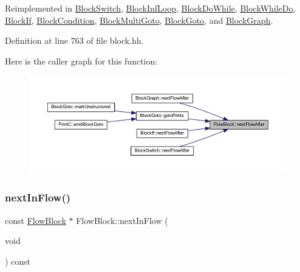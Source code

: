 Reimplemented in \mbox{\hyperlink{class_block_switch_ae13e717fc62265c1f9b5024cb0e9cd1a}{Block\+Switch}}, \mbox{\hyperlink{class_block_inf_loop_a10ef0de99961f931b7432b2662ac2677}{Block\+Inf\+Loop}}, \mbox{\hyperlink{class_block_do_while_a996ef387d4f6d645c38544d2aa4ba438}{Block\+Do\+While}}, \mbox{\hyperlink{class_block_while_do_a28f4f91e7ec3b4cc2bde0a0d432e0fe8}{Block\+While\+Do}}, \mbox{\hyperlink{class_block_if_adbc4cd5fb6cad60aa333c12532b55e1f}{Block\+If}}, \mbox{\hyperlink{class_block_condition_aefdc0e19b1623ebefa07b05b5bd85408}{Block\+Condition}}, \mbox{\hyperlink{class_block_multi_goto_a44d0021262e569ac4ecf6ecddbdf1d41}{Block\+Multi\+Goto}}, \mbox{\hyperlink{class_block_goto_acc1628a26572e23d61f4b4dad717816e}{Block\+Goto}}, and \mbox{\hyperlink{class_block_graph_aba0d42cf572bdcf2bca44d22fad971f6}{Block\+Graph}}.



Definition at line 763 of file block.\+hh.

Here is the caller graph for this function\+:
\nopagebreak
\begin{figure}[H]
\begin{center}
\leavevmode
\includegraphics[width=350pt]{class_flow_block_a400c220d6c728958396286f54de6dd9e_icgraph}
\end{center}
\end{figure}
\mbox{\label{class_flow_block_adb062ea29f2d073206adf61c317e97c7}} 
\subsubsection{\texorpdfstring{nextInFlow()}{nextInFlow()}}
{\footnotesize\ttfamily const \mbox{\hyperlink{class_flow_block}{Flow\+Block}} $\ast$ Flow\+Block\+::next\+In\+Flow (\begin{DoxyParamCaption}\item[{void}]{ }\end{DoxyParamCaption}) const}



